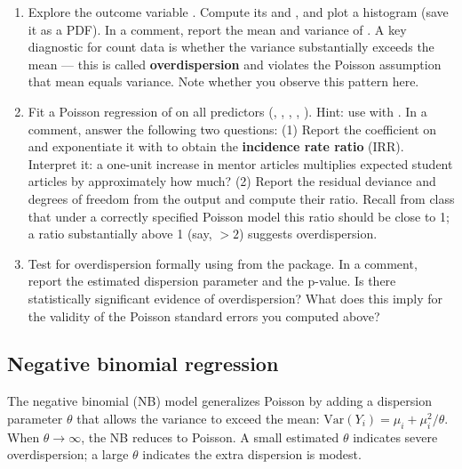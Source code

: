\begin{enumerate}[label=\alph*)]

  \item Explore the outcome variable . Compute its  and , and plot a histogram (save it as a PDF). In a comment, report the mean and variance of . A key diagnostic for count data is whether the variance substantially exceeds the mean --- this is called \textbf{overdispersion} and violates the Poisson assumption that mean equals variance. Note whether you observe this pattern here.

  \item Fit a Poisson regression of  on all predictors (, , , , ). Hint: use  with . In a comment, answer the following two questions: (1) Report the coefficient on  and exponentiate it with  to obtain the \textbf{incidence rate ratio} (IRR). Interpret it: a one-unit increase in mentor articles multiplies expected student articles by approximately how much? (2) Report the residual deviance and degrees of freedom from the  output and compute their ratio. Recall from class that under a correctly specified Poisson model this ratio should be close to 1; a ratio substantially above 1 (say, $>2$) suggests overdispersion.

  \item Test for overdispersion formally using  from the  package. In a comment, report the estimated dispersion parameter and the p-value. Is there statistically significant evidence of overdispersion? What does this imply for the validity of the Poisson standard errors you computed above?

\end{enumerate}

\subsection{Negative binomial regression}

The negative binomial (NB) model generalizes Poisson by adding a dispersion parameter $\theta$ that allows the variance to exceed the mean: $\text{Var}(Y_i) = \mu_i + \mu_i^2 / \theta$. When $\theta \to \infty$, the NB reduces to Poisson. A small estimated $\theta$ indicates severe overdispersion; a large $\theta$ indicates the extra dispersion is modest.

